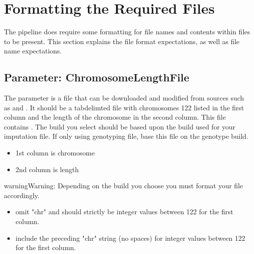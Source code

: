 \documentclass[letterpaper,10pt,english]{sphinxmanual}
\let\sphinxpxdimen\pdfpxdimen\else\newdimen\sphinxpxdimen
\begin{document}
\section{Formatting the Required Files}
\label{\detokenize{fileFormats:formatting-the-required-files}}\label{\detokenize{fileFormats::doc}}
The pipeline does require some formatting for file names and contents within files to be present.  This section explains the file format expectations, as well as file name expectations.


\subsection{Parameter: ChromosomeLengthFile}
\label{\detokenize{fileFormats:parameter-chromosomelengthfile}}\label{\detokenize{fileFormats:chromosome-length-file-format}}
The  parameter is a file that can be downloaded and modified from sources such as  and .  It should be a tab\sphinxhyphen{}delimted file with chromosomes 1\sphinxhyphen{}22 listed in the first column and the length of the chromosome in the second column. This file contains .  The build you select should be based upon the build used for your imputation file.  If only using genotyping file, base this file on the genotype build.

\noindent\sphinxincludegraphics[width=400\sphinxpxdimen]{{chromosomeLengthFile}.png}

\begin{sphinxShadowBox}
\begin{itemize}
\item {} 
1st column is chromosome

\item {} 
2nd column is length

\end{itemize}
\end{sphinxShadowBox}

\begin{sphinxadmonition}{warning}{Warning:}
  Depending on the build you choose you must format your file accordingly.
\begin{itemize}
\item {} 
 omit "chr" and should strictly be integer values between 1\sphinxhyphen{}22 for the first column.

\item {} 
 include the preceding "chr" string (no spaces) for integer values between 1\sphinxhyphen{}22 for the first column.

\end{itemize}
\end{sphinxadmonition}
\end{document}
